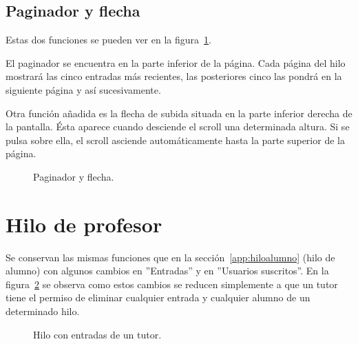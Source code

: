 \documentclass[a4paper, 12pt]{book}
\begin{document}
\subsection{Paginador y flecha}
Estas dos funciones se pueden ver en la figura~\ref{figura:hiloalumno5}.

El paginador se encuentra en la parte inferior de la p\'agina. Cada p\'agina del hilo mostrar\'a las cinco entradas m\'as recientes, las posteriores cinco 
las pondr\'a en la siguiente p\'agina y as\'i sucesivamente.

Otra funci\'on a\~nadida es la flecha de subida situada en la parte inferior derecha de la pantalla. \'Esta aparece cuando desciende el scroll una 
determinada altura. Si se pulsa sobre ella, el scroll asciende autom\'aticamente hasta la parte superior de la p\'agina.
\begin{figure}[htbp] 
  \centering
  \caption{Paginador y flecha.}
  \label{figura:hiloalumno5}
\end{figure}

\section{Hilo de profesor}
Se conservan las mismas funciones que en la secci\'on~\ref{app:hiloalumno} (hilo de alumno) con algunos cambios en ''Entradas'' y en ''Usuarios 
suscritos''. En la figura~\ref{figura:hiloprofesor} se observa como estos cambios se reducen simplemente a que un tutor tiene el permiso de eliminar 
cualquier entrada y cualquier alumno de un determinado hilo.
\begin{figure}[htbp] 
  \centering
  \caption{Hilo con entradas de un tutor.}
  \label{figura:hiloprofesor}
\end{figure}
\end{document}
